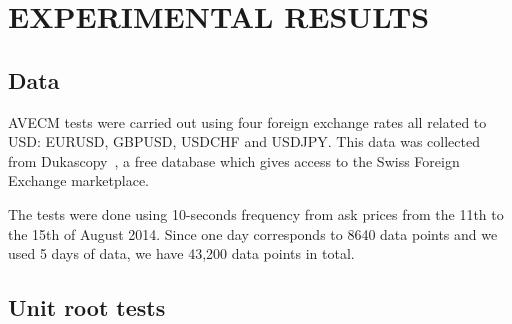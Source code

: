\section{\uppercase{Experimental results}}
\label{sec:results}
\subsection{Data} \label{sec:unitroot}
AVECM tests were carried out using four foreign exchange rates all related to
USD: EURUSD, GBPUSD, USDCHF and USDJPY. This data was collected from Dukascopy~\cite{Dukascopy2014}, a free
database which gives access to the Swiss Foreign Exchange marketplace.

The tests were done using 10-seconds frequency from ask prices
from the 11th to the 15th of August 2014. Since one day corresponds to 8640 data points and we used 5 days of data, we have 43,200 data points in total.

\subsection{Unit root tests} \label{sec:unitroot}

